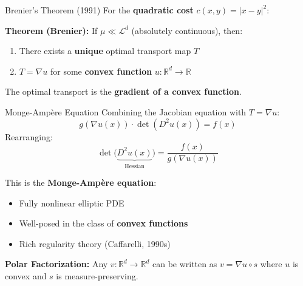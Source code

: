 \documentclass[aspectratio=169]{beamer}
\newcommand{\R}{\mathbb{R}}
\newcommand{\Ld}{\mathcal{L}^d}
\begin{document}
\begin{frame}{Brenier's Theorem (1991)}
For the \textbf{quadratic cost} $c(x,y) = |x-y|^2$:

\vspace{0.3cm}
\textbf{Theorem (Brenier):} If $\mu \ll \Ld$ (absolutely continuous), then:
\begin{enumerate}
    \item There exists a \textbf{unique} optimal transport map $T$
    \item $T = \nabla u$ for some \textbf{convex function} $u: \R^d \to \R$
\end{enumerate}

\vspace{0.3cm}
\begin{center}
\end{center}

\vspace{0.2cm}
The optimal transport is the \textbf{gradient of a convex function}.
\end{frame}

\begin{frame}{Monge-Amp\`ere Equation}
Combining the Jacobian equation with $T = \nabla u$:
\[
g(\nabla u(x)) \cdot \det(D^2 u(x)) = f(x)
\]
Rearranging:
\[
\det\bigl(\underbrace{D^2 u(x)}_{\text{Hessian}}\bigr) = \frac{f(x)}{g(\nabla u(x))}
\]

\vspace{0.3cm}
This is the \textbf{Monge-Amp\`ere equation}:
\begin{itemize}
    \item Fully nonlinear elliptic PDE
    \item Well-posed in the class of \textbf{convex functions}
    \item Rich regularity theory (Caffarelli, 1990s)
\end{itemize}

\vspace{0.3cm}
\textbf{Polar Factorization:} Any $v: \R^d \to \R^d$ can be written as $v = \nabla u \circ s$ where $u$ is convex and $s$ is measure-preserving.
\end{frame}
\end{document}
